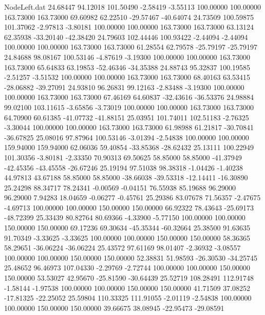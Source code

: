 \begin{filecontents}{NodeLeft.dat}
  24.68447   94.12018  101.50490    -2.58419   -3.55113  100.00000  100.00000  163.73000  163.73000   69.60982   62.22510  -29.57467  -40.64074
  24.73509  100.59875  101.37062    -2.97813   -3.80181  100.00000  100.00000  163.73000  163.73000   63.13124   62.35938  -33.20140  -42.38420
  24.79603  102.44446  100.93422    -2.44094   -2.44094  100.00000  100.00000  163.73000  163.73000   61.28554   62.79578  -25.79197  -25.79197
  24.84688   98.08167  100.53146    -4.87619   -3.19300  100.00000  100.00000  163.73000  163.73000   65.64833   63.19853  -52.46346  -34.35388
  24.88743   95.32837  100.19585    -2.51257   -3.51532  100.00000  100.00000  163.73000  163.73000   68.40163   63.53415  -28.06882  -39.27091
  24.93810   96.26831   99.12163    -2.83488   -3.19300  100.00000  100.00000  163.73000  163.73000   67.46169   64.60837  -32.43616  -36.53376
  24.98884   99.02100  103.11615    -3.65856   -3.73019  100.00000  100.00000  163.73000  163.73000   64.70900   60.61385  -41.07732  -41.88151
  25.03951  101.74011  102.51183    -2.76325   -3.30044  100.00000  100.00000  163.73000  163.73000   61.98988   61.21817  -30.70841  -36.67825
  25.08016   97.87964  100.53146    -3.01394   -2.54838  100.00000  100.00000  159.94000  159.94000   62.06036   59.40854  -33.85368  -28.62432
  25.13111  100.22949  101.30356    -3.80181   -2.33350   70.90313   69.50625   58.85000   58.85000  -41.37949  -42.45356  -43.45558  -26.67246
  25.19194   97.51038   98.38318    -1.04426   -1.40238   44.97813   43.67188   58.85000   58.85000  -38.66038  -39.53318  -12.14411  -16.30890
  25.24298   88.34717   78.24341    -0.00569   -0.04151   76.55938   85.19688   96.29000   96.29000    7.94283   18.04659   -0.06277   -0.45761
  25.29386   83.07678   71.56357    -2.47675   -4.69713  100.00000  100.00000  150.00000  150.00000   66.92322   78.43643  -25.69173  -48.72399
  25.33439   80.82764   80.69366    -4.33900   -5.77150  100.00000  100.00000  150.00000  150.00000   69.17236   69.30634  -45.35344  -60.32664
  25.38500   91.63635   91.70349    -3.33625   -3.33625  100.00000  100.00000  150.00000  150.00000   58.36365   58.29651  -36.06224  -36.06224
  25.43572   97.61169   98.01407    -2.36932   -3.08557  100.00000  100.00000  150.00000  150.00000   52.38831   51.98593  -26.30530  -34.25745
  25.48652   96.46973  107.04330    -2.29769   -2.72744  100.00000  100.00000  150.00000  150.00000   53.53027   42.95670  -25.81590  -30.64439
  25.52719  108.28491  112.91748    -1.58144   -1.97538  100.00000  100.00000  150.00000  150.00000   41.71509   37.08252  -17.81325  -22.25052
  25.59804  110.33325  111.91055    -2.01119   -2.54838  100.00000  100.00000  150.00000  150.00000   39.66675   38.08945  -22.95473  -29.08591

\end{filecontents}
